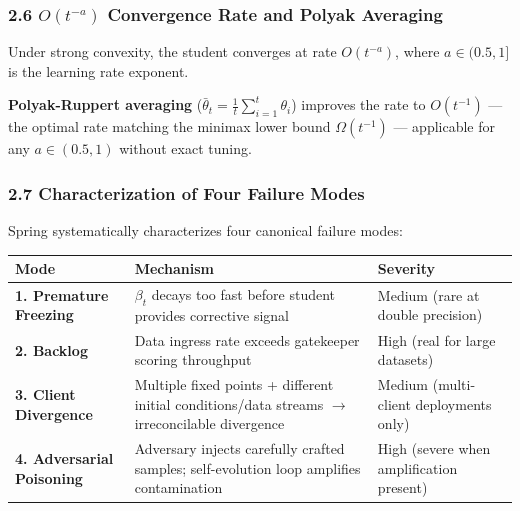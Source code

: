 \documentclass[
  12pt,
]{article}
\begin{document}
\subsubsection{2.6 $O(t^{-a})$ Convergence Rate and Polyak Averaging}\label{convergence-rate-polyak}

Under strong convexity, the student converges at rate $O(t^{-a})$, where $a \in (0.5, 1]$ is the learning rate exponent.

\textbf{Polyak-Ruppert averaging} ($\bar{\theta}_t = \frac{1}{t}\sum_{i=1}^t \theta_i$) improves the rate to $O(t^{-1})$ --- the optimal rate matching the minimax lower bound $\Omega(t^{-1})$ --- applicable for any $a \in (0.5, 1)$ without exact tuning.

\subsubsection{2.7 Characterization of Four Failure Modes}\label{four-failure-modes}

Spring systematically characterizes four canonical failure modes:

\begin{longtable}[]{@{}
  >{\raggedright\arraybackslash}p{}
  >{\raggedright\arraybackslash}p{}
  >{\raggedright\arraybackslash}p{}@{}}
\toprule\noalign{}
\begin{minipage}[b]{\linewidth}\raggedright
Mode
\end{minipage} & \begin{minipage}[b]{\linewidth}\raggedright
Mechanism
\end{minipage} & \begin{minipage}[b]{\linewidth}\raggedright
Severity
\end{minipage} \\
\midrule\noalign{}
\endhead
\bottomrule\noalign{}
\endlastfoot
\textbf{1. Premature Freezing} & $\beta_t$ decays too fast before student provides corrective signal & Medium (rare at double precision) \\
\textbf{2. Backlog} & Data ingress rate exceeds gatekeeper scoring throughput & High (real for large datasets) \\
\textbf{3. Client Divergence} & Multiple fixed points + different initial conditions/data streams $\to$ irreconcilable divergence & Medium (multi-client deployments only) \\
\textbf{4. Adversarial Poisoning} & Adversary injects carefully crafted samples; self-evolution loop amplifies contamination & High (severe when amplification present) \\
\end{longtable}
\end{document}
